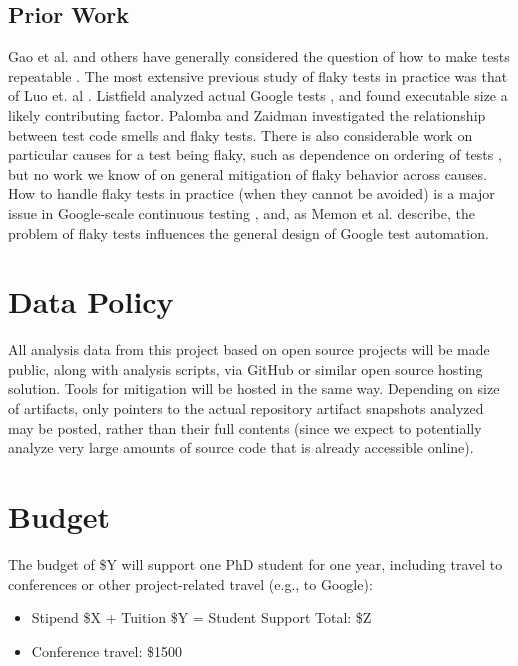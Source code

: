 \documentclass[10pt]{article}
\begin{document}
\subsection{Prior Work}


Gao et al. and others have generally considered the question of how to make tests repeatable \cite{Gao:2015:MSU:2818754.2818764}.  
The most extensive previous study of flaky tests in practice was that of Luo et. al \cite{luo2014empirical}.  Listfield analyzed actual Google tests \cite{listfieldtestanalysis}, and found executable size a likely contributing factor. Palomba and Zaidman \cite{palomba2017does} investigated the relationship between test code smells and flaky tests.  There is also considerable work on particular causes for a test being flaky, such as dependence on ordering of tests \cite{LamZE2015}, but no work we know of on general mitigation of flaky behavior across causes.  How to handle flaky tests in practice (when they cannot be avoided) is a major issue in Google-scale continuous testing \cite{memon2017taming}, and, as Memon et al. describe, the problem of flaky tests influences the general design of Google test automation.




\section{Data Policy}

All analysis data from this project based on open source projects will be made public, along with analysis scripts, via GitHub or similar open source hosting solution.  Tools for mitigation will be hosted in the same way.  Depending on size of artifacts, only pointers to the actual repository artifact snapshots analyzed may be posted, rather than their full contents (since we expect to potentially analyze very large amounts of source code that is already accessible online).

\section{Budget}

The budget of \$Y will support one PhD student for one year, including travel to conferences or other project-related travel (e.g., to Google):

\begin{itemize}
\item Stipend \$X + Tuition \$Y = Student Support Total: \$Z
\item Conference travel: \$1500
\end{itemize}
\end{document}
